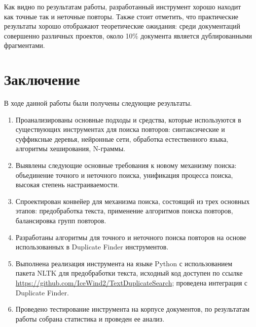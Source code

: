 \documentclass[14pt]{matmex-diploma-custom}
\begin{document}
Как видно по результатам работы, разработанный инструмент хорошо находит как точные так и неточные повторы. Также стоит отметить, что практические результаты хорошо отображают теоретические ожидания: среди документаций совершенно различных проектов, около 10\% документа является дублированными фрагментами.

\clearpage
\section*{Заключение}
В ходе данной работы были получены следующие результаты.
\begin{enumerate}
   	\item Проанализированы основные подходы и средства, которые используются в существующих инструментах для поиска повторов: синтаксические и суффиксные деревья, нейронные сети, обработка естественного языка, алгоритмы хеширования, N-граммы.
   	\item Выявлены следующие основные требования к новому механизму поиска: объединение точного и неточного поиска, унификация процесса поиска, высокая степень настраиваемости.
   	\item Спроектирован конвейер для механизма поиска, состоящий из трех основных этапов: предобработка текста, применение алгоритмов поиска повторов, балансировка групп повторов.
   	\item Разработаны алгоритмы для точного и неточного поиска повторов на основе использованных в Duplicate Finder инструментов.
   	\item Выполнена реализация инструмента на языке Python с использованием пакета NLTK для предобработки текста, исходный код доступен по ссылке \mbox{\url{https://github.com/IceWind2/TextDuplicateSearch}}; проведена интеграция с Duplicate Finder.
   	\item Проведено тестирование инструмента на корпусе документов, по результатам работы собрана статистика и проведен ее анализ.
\end{enumerate}


\setmonofont[Mapping=tex-text]{CMU Typewriter Text}


\end{document}
